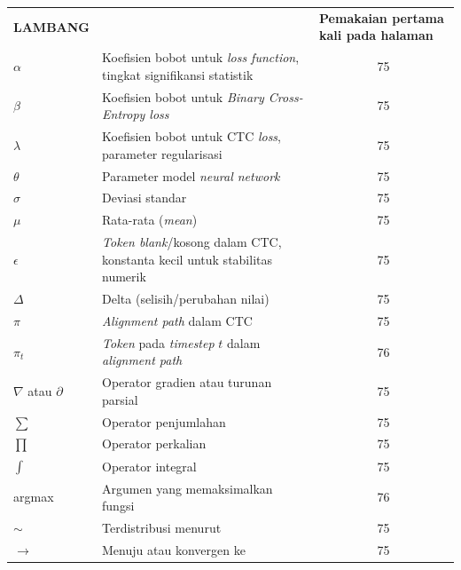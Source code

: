 \begin{longtable}{@{} l >{\raggedright\arraybackslash}p{6.5cm} c @{}}
\multicolumn{1}{l}{\textbf{LAMBANG}} & \multicolumn{1}{l}{\textbf{Nama}} & \multicolumn{1}{l}{\parbox[c]{3.5cm}{\raggedright \textbf{Pemakaian pertama kali pada halaman}}} \\



$\alpha$ & Koefisien bobot untuk \textit{loss function}, tingkat signifikansi statistik & 75 \\
$\beta$ & Koefisien bobot untuk \textit{Binary Cross-Entropy loss} & 75 \\
$\lambda$ & Koefisien bobot untuk CTC \textit{loss}, parameter regularisasi & 75 \\
$\theta$ & Parameter model \textit{neural network} & 75 \\
$\sigma$ & Deviasi standar & 75 \\
$\mu$ & Rata-rata (\textit{mean}) & 75 \\
$\epsilon$ & \textit{Token blank}/kosong dalam CTC, konstanta kecil untuk stabilitas numerik & 75 \\
$\Delta$ & Delta (selisih/perubahan nilai) & 75 \\
$\pi$ & \textit{Alignment path} dalam CTC & 75 \\
$\pi_t$ & \textit{Token} pada \textit{timestep} $t$ dalam \textit{alignment path} & 76 \\[1ex]


$\nabla$ atau $\partial$ & Operator gradien atau turunan parsial & 75 \\
$\sum$ & Operator penjumlahan & 75 \\
$\prod$ & Operator perkalian & 75 \\
$\int$ & Operator integral & 75 \\
argmax & Argumen yang memaksimalkan fungsi & 76 \\
$\sim$ & Terdistribusi menurut & 75 \\
$\to$ & Menuju atau konvergen ke & 75 \\[1ex]


\end{longtable}
